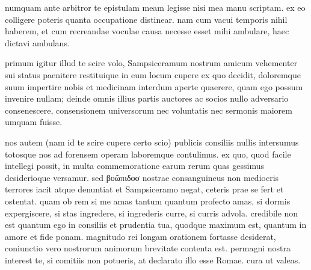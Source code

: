 


 numquam ante arbitror te epistulam meam legisse nisi mea manu scriptam. ex eo colligere poteris quanta occupatione distinear. nam cum vacui temporis nihil haberem, et cum recreandae voculae causa necesse esset mihi ambulare, haec dictavi ambulans.

 primum igitur illud te scire volo, Sampsiceramum nostrum amicum vehementer sui status paenitere restituique in eum locum cupere ex quo decidit, doloremque suum impertire nobis et medicinam interdum aperte quaerere, quam ego possum invenire nullam; deinde omnis illius partis auctores ac socios nullo adversario consenescere, consensionem universorum nec voluntatis nec sermonis maiorem umquam fuisse.

 nos autem (nam id te scire cupere certo scio) publicis consiliis nullis intersumus totosque nos ad forensem operam laboremque contulimus. ex quo, quod facile intellegi possit, in multa commemoratione earum rerum quas gessimus desiderioque versamur. sed βοῶπιδοσ nostrae consanguineus non mediocris terrores iacit atque denuntiat et Sampsiceramo negat, ceteris prae se fert et ostentat. quam ob rem si me amas tantum quantum profecto amas, si dormis expergiscere, si stas ingredere, si ingrederis curre, si curris advola. credibile non est quantum ego in consiliis et prudentia tua, quodque maximum est, quantum in amore et fide ponam. magnitudo rei longam orationem fortasse desiderat, coniunctio vero nostrorum animorum brevitate contenta est. permagni nostra interest te, si comitiis non potueris, at declarato illo esse Romae. cura ut valeas.
